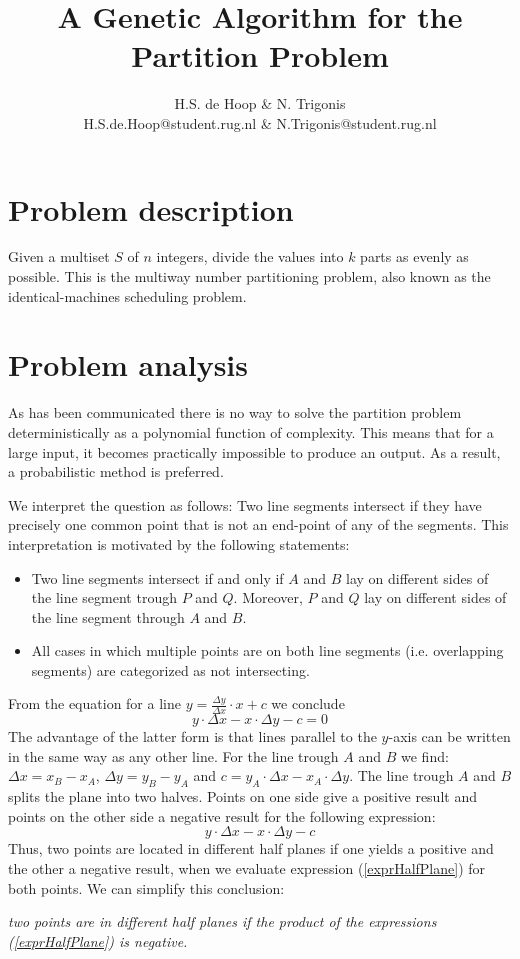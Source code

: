 \documentclass[a4paper,10pt]{article}
\title{A Genetic Algorithm for the Partition Problem}
\author{H.S. de Hoop \& N. Trigonis\\
        H.S.de.Hoop@student.rug.nl \& N.Trigonis@student.rug.nl}
\begin{document}
\maketitle

\section{Problem description}
Given a multiset $S$ of $n$ integers, divide the values into $k$ parts as evenly as possible.
This is the multiway number partitioning problem, also known as the identical-machines scheduling problem.
\section{Problem analysis}
As has been communicated there is no way to solve the partition problem deterministically as a polynomial function of complexity. This means that for a large input, it becomes practically impossible to produce an output.
As a result, a probabilistic method is preferred.


We interpret the question as follows: Two line segments intersect if they have precisely one common point that is not an end-point of any of the segments.
This interpretation is motivated by the following statements:
\begin{itemize}
\item Two line segments intersect if and only if $A$ and $B$ lay on different sides of the line segment trough $P$ and $Q$. Moreover, $P$ and $Q$ lay on different sides of the line segment through $A$ and $B$.
\item All cases in which multiple points are on both line segments (i.e. overlapping segments) are categorized as not intersecting.
\end{itemize}
From the equation for a line $y = \frac{\Delta y}{\Delta x}\cdot x + c$ we conclude
$$ y\cdot \Delta x - x \cdot \Delta y - c = 0
$$ 
The advantage of the latter form is that lines parallel to the $y$-axis can be written in the same way as any other line.
For the line trough $A$ and $B$ we find: 
$\Delta x = x_B - x_A$, $\Delta y = y_B - y_A$ and $c = y_A \cdot \Delta x - x_A \cdot \Delta y$.
The line trough $A$ and $B$ splits the plane into two halves. Points on one side give a positive result and points on the other side a negative result for the following expression:
\begin{equation}\label{exprHalfPlane}
y \cdot \Delta x - x \cdot \Delta y - c
\end{equation}
Thus, two points are located in different half planes if one yields a positive and the other a negative result, when we evaluate expression (\ref{exprHalfPlane}) for both points.
We can simplify this conclusion: \\[2mm]
\centerline{\it two points are in different half planes if the product of the expressions (\ref{exprHalfPlane}) is negative.}
\end{document}
